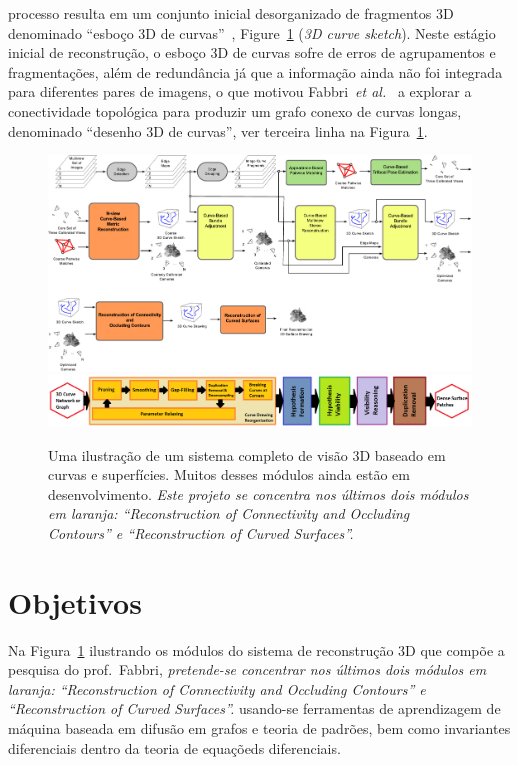 \documentclass[a4paper,titlepage]{article}
\newcommand{\etal}{{\it et al.}}
\begin{document}
processo resulta em um conjunto inicial desorganizado de fragmentos 3D
denominado ``esboço 3D de
curvas''~\cite{fabbri2011multiview,fabbri2016multiview},
Figure~\ref{fig:lofting:pipeline} (\emph{3D curve sketch}). Neste estágio
inicial de reconstrução, o esboço 3D de curvas sofre de erros de agrupamentos e
fragmentações, além de redundância já que a informação ainda não foi integrada
para diferentes pares de imagens, o que motivou Fabbri~\etal~\cite{usumezbas2016multiview}
a explorar a conectividade topológica  para produzir um grafo conexo de
curvas longas, denominado ``desenho 3D de curvas'', ver terceira linha na
Figura~\ref{fig:lofting:pipeline}.
\begin{figure}
  \begin{center}
    \includegraphics[width=\linewidth]{figs/mega-system-drawing-pt.pdf}
    \includegraphics[width=\linewidth]{figs/lofting-pipeline.png}
  \end{center}
  \caption{Uma ilustração de um sistema completo de visão 3D baseado em curvas e
  superfícies. Muitos desses módulos ainda estão em desenvolvimento. \emph{Este
projeto se concentra nos últimos dois módulos em laranja: ``Reconstruction of
Connectivity and Occluding Contours'' e ``Reconstruction of Curved Surfaces''.}}
  \label{fig:lofting:pipeline}
\end{figure}


\section{Objetivos}

Na Figura~\ref{fig:lofting:pipeline} ilustrando os módulos do sistema de
reconstrução 3D que compõe a pesquisa do prof.\ Fabbri, \emph{pretende-se concentrar
nos últimos dois módulos em laranja: ``Reconstruction of Connectivity and
Occluding Contours'' e ``Reconstruction of Curved Surfaces''.}
usando-se ferramentas de aprendizagem de máquina baseada em
difusão em grafos e teoria de padrões, bem como invariantes diferenciais dentro
da teoria de equaçõeds diferenciais.
\end{document}
